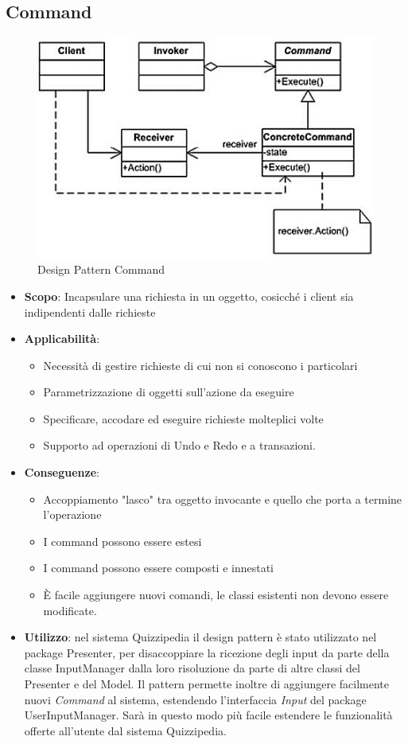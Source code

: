 	\subsection{Command}
	\begin{figure}[h!]
	\begin{center}
		\includegraphics[scale=1]{../images/Command.png}
		\caption{Design Pattern Command}
	\end{center}
	\end{figure}
	\begin{itemize}
		\item\textbf{Scopo}: Incapsulare una richiesta in un oggetto, cosicché i
client sia indipendenti dalle richieste
		\item\textbf{Applicabilità}:
		\begin{itemize}
			\item Necessità di gestire richieste di cui non si conoscono i
particolari
			\item Parametrizzazione di oggetti sull'azione da eseguire
			\item Specificare, accodare ed eseguire richieste molteplici
volte
			\item Supporto ad operazioni di Undo e Redo e a transazioni.
		\end{itemize}
		\item\textbf{Conseguenze}:
		\begin{itemize}
			\item Accoppiamento "lasco" tra oggetto invocante e
quello che porta a termine l'operazione
			\item I command possono essere estesi
			\item I command possono essere composti e innestati
			\item È facile aggiungere nuovi comandi, le classi esistenti non devono essere modificate.
		\end{itemize}
		\item\textbf{Utilizzo}: nel sistema Quizzipedia il design pattern è stato utilizzato nel package Presenter, per disaccoppiare la ricezione degli input da parte della classe InputManager dalla loro risoluzione da parte di altre classi del Presenter e del Model. Il pattern permette inoltre di aggiungere facilmente nuovi \emph{Command} al sistema, estendendo l'interfaccia \emph{Input} del package UserInputManager. Sarà in questo modo più facile estendere le funzionalità offerte all'utente dal sistema Quizzipedia.
	\end{itemize}

